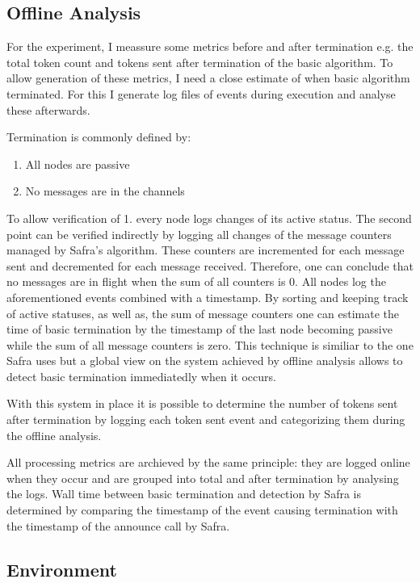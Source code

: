   

\subsection{Offline Analysis}
\label{ssec:offline-analysis}
For the experiment, I meassure some metrics before and after termination e.g. the total token count and tokens sent after termination of the basic algorithm.
To allow generation of these metrics, I need a close estimate of when basic algorithm terminated.
For this I generate log files of events during execution and analyse these afterwards.

Termination is commonly defined by:
\begin{enumerate}
	\item All nodes are passive
	\item No messages are in the channels
\end{enumerate}
To allow verification of 1. every node logs changes of its active status.
The second point can be verified indirectly by logging all changes of the message counters managed by Safra's algorithm.
These counters are incremented for each message sent and decremented for each message received.
Therefore, one can conclude that no messages are in flight when the sum of all counters is 0.
All nodes log the aforementioned events combined with a timestamp.
By sorting and keeping track of active statuses, as well as, the sum of message counters one can estimate the time of basic termination by the timestamp of the last node becoming passive while the sum of all message counters is zero.
This technique is similiar to the one Safra uses but a global view on the system achieved by offline analysis allows to detect basic termination immediatedly when it occurs.

With this system in place it is possible to determine the number of tokens sent after termination by logging each token sent event and categorizing them during the offline analysis.

All processing metrics are archieved by the same principle: they are logged online when they occur and are grouped into total and after termination by analysing the logs.
Wall time between basic termination and detection by Safra is determined by comparing the timestamp of the event causing termination with the timestamp of the announce call by Safra.

\subsection{Environment}
